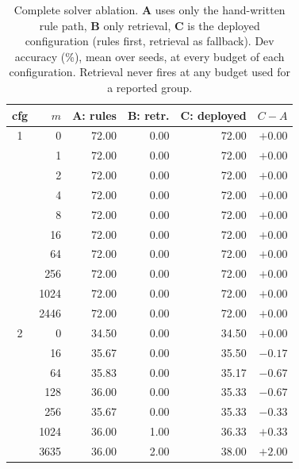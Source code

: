 \begin{table}[t]\centering\small
\setlength{\tabcolsep}{4pt}
\caption{Complete solver ablation. \textbf{A} uses only the hand-written rule
path, \textbf{B} only retrieval, \textbf{C} is the deployed configuration
(rules first, retrieval as fallback). Dev accuracy (\%), mean over seeds, at
every budget of each configuration. Retrieval never fires at any budget used
for a reported group.}
\label{tab:supp-ablation}
\begin{tabular}{cr rrr r}
\toprule
cfg & $m$ & A: rules & B: retr. & C: deployed & $C-A$ \\
\midrule
1 & 0 & 72.00 & 0.00 & 72.00 & $+0.00$ \\
 & 1 & 72.00 & 0.00 & 72.00 & $+0.00$ \\
 & 2 & 72.00 & 0.00 & 72.00 & $+0.00$ \\
 & 4 & 72.00 & 0.00 & 72.00 & $+0.00$ \\
 & 8 & 72.00 & 0.00 & 72.00 & $+0.00$ \\
 & 16 & 72.00 & 0.00 & 72.00 & $+0.00$ \\
 & 64 & 72.00 & 0.00 & 72.00 & $+0.00$ \\
 & 256 & 72.00 & 0.00 & 72.00 & $+0.00$ \\
 & 1024 & 72.00 & 0.00 & 72.00 & $+0.00$ \\
 & 2446 & 72.00 & 0.00 & 72.00 & $+0.00$ \\
2 & 0 & 34.50 & 0.00 & 34.50 & $+0.00$ \\
 & 16 & 35.67 & 0.00 & 35.50 & $-0.17$ \\
 & 64 & 35.83 & 0.00 & 35.17 & $-0.67$ \\
 & 128 & 36.00 & 0.00 & 35.33 & $-0.67$ \\
 & 256 & 35.67 & 0.00 & 35.33 & $-0.33$ \\
 & 1024 & 36.00 & 1.00 & 36.33 & $+0.33$ \\
 & 3635 & 36.00 & 2.00 & 38.00 & $+2.00$ \\
\bottomrule
\end{tabular}
\end{table}
